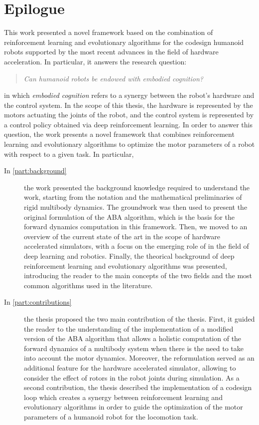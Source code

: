 \chapter*{Epilogue}
\label{chp:99-Epilogue}

This work presented a novel framework based on the combination of reinforcement learning and evolutionary algorithms for the codesign humanoid robots supported by the most recent advances in the field of hardware acceleration. In particular, it answers the research question:

\begin{quote}
    \textit{
        Can humanoid robots be endowed with embodied cognition?}
\end{quote}

in which \textit{embodied cognition} refers to a synergy between the robot's hardware and the control system. In the scope of this thesis, the hardware is represented by the motors actuating the joints of the robot, and the control system is represented by a control policy obtained via deep reinforcement learning.
In order to answer this question, the work presents a novel framework that combines reinforcement learning and evolutionary algorithms to optimize the motor parameters of a robot with respect to a given task. In particular,

\begin{description}
    \item[In \cref{part:background}] the work presented the background knowledge required to understand the work, starting from the notation and the mathematical preliminaries of rigid multibody dynamics. The groundwork was then used to present the original formulation of the \ac{ABA} algorithm, which is the basis for the forward dynamics computation in this framework. Then, we moved to an overview of the current state of the art in the scope of hardware accelerated simulators, with a focus on the emerging role of \jax in the field of deep learning and robotics. Finally, the theorical background of deep reinforcement learning and evolutionary algorithms was presented, introducing the reader to the main concepts of the two fields and the most common algorithms used in the literature.
    \item[In \cref{part:contributions}] the thesis proposed the two main contribution of the thesis. First, it guided the reader to the understanding of the implementation of a modified version of the \ac{ABA} algorithm that allows a holistic computation of the forward dynamics of a multibody system when there is the need to take into account the motor dynamics. Moreover, the reformulation served as an additional feature for the hardware accelerated \jaxsim simulator, allowing to consider the effect of rotors in the robot joints during simulation. As a second contribution, the thesis described the implementation of a codesign loop which creates a synergy between reinforcement learning and evolutionary algorithms in order to guide the optimization of the motor parameters of a humanoid robot for the locomotion task.
\end{description}

